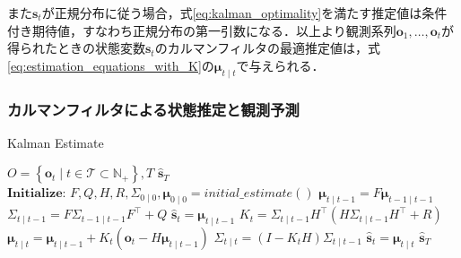     また$\bm{s}_t$が正規分布に従う場合，式\ref{eq:kalman_optimality}を満たす推定値は条件付き期待値，すなわち正規分布の第一引数になる．以上より観測系列$\bm{o}_1, \dots, \bm{o}_t$が得られたときの状態変数$\bm{s}_t$のカルマンフィルタの最適推定値は，式\ref{eq:estimation_equations_with_K}の$\bm{\mu}_{t \mid t}$で与えられる．

    \subsubsection{カルマンフィルタによる状態推定と観測予測}

    \begin{algorithm}[t]
        \caption[Kalman Estimate]{Kalman Estimate}
        \label{alg:kalman_estimate}
        \begin{algorithmic}[1]
            \Require $O = \left\{\bm{o}_t \mid t \in \mathcal{T} \subset \mathbb{N}_+\right\}, T$
            \Ensure $\hat{\bm{s}}_T$
            \State $\textbf{Initialize: } F, Q, H, R, \Sigma_{0 \mid 0}, \bm{\mu}_{0 \mid 0} = initial\_estimate()$
                \State $\bm{\mu}_{t \mid t-1} = F \bm{\mu}_{t-1 \mid t-1}$
                \State $\Sigma_{t \mid t-1} = F \Sigma_{t-1 \mid t-1} F^{\top} + Q$
                \State $\hat{\bm{s}}_t = \bm{\mu}_{t \mid t-1}$
                    \State $K_t = \Sigma_{t \mid t-1} H^{\top} \left( H \Sigma_{t \mid t-1} H^{\top} + R\right)$
                    \State $\bm{\mu}_{t \mid t} = \bm{\mu}_{t \mid t-1} + K_t \left( \bm{o}_t - H \bm{\mu}_{t \mid t-1} \right)$
                    \State $\Sigma_{t \mid t} = \left( I - K_t H \right) \Sigma_{t \mid t-1}$
                    \State $\hat{\bm{s}}_t = \bm{\mu}_{t \mid t}$
                \EndIf
            \EndFor
            \State \Return $\hat{\bm{s}}_T$
        \end{algorithmic}
    \end{algorithm}

